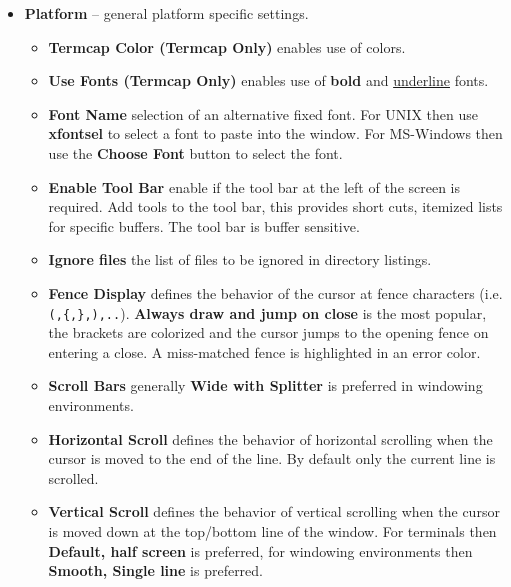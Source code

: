 \documentclass[11pt,a4paper,pdftex]{article}
\begin{document}
\begin{itemize}
\begin{itemize}
    \end{itemize}

    \item \textbf{Platform} -- general platform specific settings.

    \begin{itemize}

      \item \textbf{Termcap Color (Termcap Only)} enables use of colors.

      \item \textbf{Use Fonts (Termcap Only)} enables use of \textbf{bold} and
      \underline{underline} fonts.

      \item \textbf{Font Name} selection of an alternative fixed font. For
      UNIX then use \textbf{xfontsel} to select a font to paste into the
      window. For MS-Windows then use the \textbf{Choose Font} button to
      select the font.

      \item \textbf{Enable Tool Bar} enable if the tool bar at the left of the
      screen is required. Add tools to the tool bar, this provides short cuts,
      itemized lists for specific buffers. The tool bar is buffer sensitive.

      \item \textbf{Ignore files} the list of files to be ignored in directory
      listings.

      \item \textbf{Fence Display} defines the behavior of the cursor at fence
      characters (i.e. \texttt{(,\{,\},),..}). \textbf{Always draw and jump on
      close} is the most popular, the brackets are colorized and the cursor
      jumps to the opening fence on entering a close. A miss-matched fence is
      highlighted in an error color.

      \item \textbf{Scroll Bars} generally \textbf{Wide with Splitter} is
      preferred in windowing environments.

      \item \textbf{Horizontal Scroll} defines the behavior of horizontal
      scrolling when the cursor is moved to the end of the line. By default
      only the current line is scrolled.

      \item \textbf{Vertical Scroll} defines the behavior of vertical
      scrolling when the cursor is moved down at the top/bottom line of the
      window. For terminals then \textbf{Default, half screen} is preferred,
      for windowing environments then \textbf{Smooth, Single line} is
      preferred.


\end{itemize}
\end{itemize}
\end{document}

